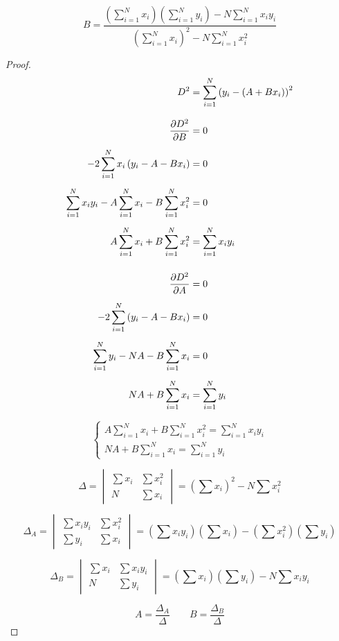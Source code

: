 \documentclass[12pt]{article}
\begin{document}
\[
\boxed{
B=
\frac{
\left(\sum_{i=1}^{N}x_i\right)
\left(\sum_{i=1}^{N}y_i\right)
-
N\sum_{i=1}^{N}x_iy_i
}{
\left(\sum_{i=1}^{N}x_i\right)^2
-
N\sum_{i=1}^{N}x_i^2
}
}
\]

\begin{proof}
    
\begin{align}
D^2 &= \sum_{i=1}^{N}\left(y_i-(A+Bx_i)\right)^2
\\[8pt]
%
\pdv{D^2}{B} &= 0
\\[5pt]
-2\sum_{i=1}^{N}x_i\left(y_i-A-Bx_i\right) &= 0
\\[5pt]
\sum_{i=1}^{N}x_iy_i
-A\sum_{i=1}^{N}x_i
-B\sum_{i=1}^{N}x_i^2 &= 0
\\[5pt]
A\sum_{i=1}^{N}x_i+B\sum_{i=1}^{N}x_i^2
&= \sum_{i=1}^{N}x_iy_i
\\[12pt]
%
\pdv{D^2}{A} &= 0
\\[5pt]
-2\sum_{i=1}^{N}\left(y_i-A-Bx_i\right) &= 0
\\[5pt]
\sum_{i=1}^{N}y_i-NA-B\sum_{i=1}^{N}x_i &= 0
\\[5pt]
NA+B\sum_{i=1}^{N}x_i
&= \sum_{i=1}^{N}y_i
\end{align}

\[
\begin{cases}
A\displaystyle\sum_{i=1}^{N}x_i
+B\displaystyle\sum_{i=1}^{N}x_i^2
=\displaystyle\sum_{i=1}^{N}x_iy_i
\\[10pt]
NA+B\displaystyle\sum_{i=1}^{N}x_i
=\displaystyle\sum_{i=1}^{N}y_i
\end{cases}
\]

\[
\Delta =
\begin{vmatrix}
\sum x_i & \sum x_i^2\\
N & \sum x_i
\end{vmatrix}
=
\left(\sum x_i\right)^2-N\sum x_i^2
\]

\[
\Delta_A =
\begin{vmatrix}
\sum x_iy_i & \sum x_i^2\\
\sum y_i & \sum x_i
\end{vmatrix}
=
\left(\sum x_iy_i\right)\left(\sum x_i\right)
-\left(\sum x_i^2\right)\left(\sum y_i\right)
\]

\[
\Delta_B =
\begin{vmatrix}
\sum x_i & \sum x_iy_i\\
N & \sum y_i
\end{vmatrix}
=
\left(\sum x_i\right)\left(\sum y_i\right)
-N\sum x_iy_i
\]

\[
\boxed{
A=\frac{\Delta_A}{\Delta}
\qquad
B=\frac{\Delta_B}{\Delta}
}
\]
\end{proof}
\end{document}
